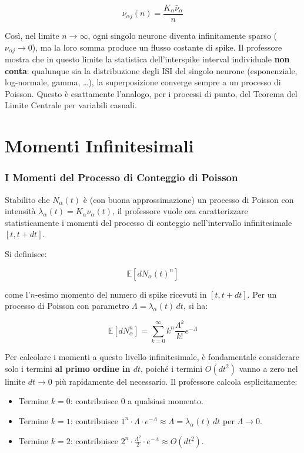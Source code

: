 \begin{equation}
\nu_{\alpha j}(n) = \frac{K_\alpha \bar{\nu}_\alpha}{n}
\end{equation}

Così, nel limite $n \to \infty$, ogni singolo neurone diventa infinitamente sparso ($\nu_{\alpha j} \to 0$), ma la loro somma produce un flusso costante di spike. Il professore mostra che in questo limite la statistica dell'interspike interval individuale \textbf{non conta}: qualunque sia la distribuzione degli ISI del singolo neurone (esponenziale, log-normale, gamma, \dots), la superposizione converge sempre a un processo di Poisson. Questo è esattamente l'analogo, per i processi di punto, del Teorema del Limite Centrale per variabili casuali.


\section{Momenti Infinitesimali}

\subsubsection{I Momenti del Processo di Conteggio di Poisson}

Stabilito che $N_\alpha(t)$ è (con buona approssimazione) un processo di Poisson con intensità $\lambda_\alpha(t) = K_\alpha \nu_\alpha(t)$, il professore vuole ora caratterizzare statisticamente i momenti del processo di conteggio nell'intervallo infinitesimale $[t, t + dt]$.

Si definisce:

\begin{equation}
\mathbb{E}[dN_\alpha(t)^n]
\end{equation}

come l'$n$-esimo momento del numero di spike ricevuti in $[t, t+dt]$. Per un processo di Poisson con parametro $\Lambda = \lambda_\alpha(t)\, dt$, si ha:

\begin{equation}
\mathbb{E}[dN_\alpha^n] = \sum_{k=0}^{\infty} k^n \frac{\Lambda^k}{k!} e^{-\Lambda}
\end{equation}

Per calcolare i momenti a questo livello infinitesimale, è fondamentale considerare solo i termini \textbf{al primo ordine in $dt$}, poiché i termini $O(dt^2)$ vanno a zero nel limite $dt \to 0$ più rapidamente del necessario. Il professore calcola esplicitamente:

\begin{itemize}
    \item Termine $k=0$: contribuisce $0$ a qualsiasi momento.
    \item Termine $k=1$: contribuisce $1^n \cdot \Lambda \cdot e^{-\Lambda} \approx \Lambda = \lambda_\alpha(t)\, dt$ per $\Lambda \to 0$.
    \item Termine $k=2$: contribuisce $2^n \cdot \frac{\Lambda^2}{2} \cdot e^{-\Lambda} \approx O(dt^2)$.
\end{itemize}

